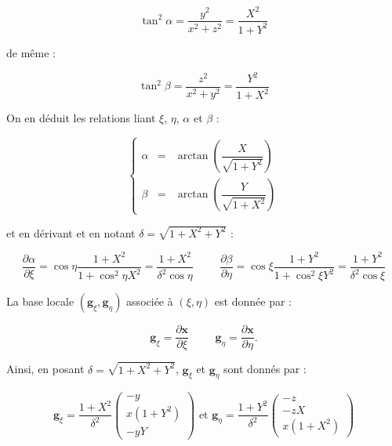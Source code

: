 \begin{equation}
\tan^2 \alpha = \dfrac{y^2}{x^2+z^2} = \dfrac{X^2}{1+Y^2}
\end{equation}

de même :

\begin{equation}
\tan^2 \beta = \dfrac{z^2}{x^2+y^2} = \dfrac{Y^2}{1+X^2}
\end{equation}

On en déduit les relations liant $\xi$, $\eta$, $\alpha$ et $\beta$ :

\begin{equation}
\left\lbrace
\begin{array}{rcl}
\alpha & = & \arctan \left( \dfrac{X}{\sqrt{1+Y^2}} \right)\\
\beta & = & \arctan \left( \dfrac{Y}{\sqrt{1+X^2}} \right)
\end{array}
\right.
\label{eq: alpha(xi) beta(eta)}
\end{equation}

et en dérivant et en notant $\delta=\sqrt{1+X^2+Y^2}$ :

\begin{equation}
\dfrac{\partial \alpha}{\partial \xi} = \cos \eta \dfrac{1+X^2}{1+\cos^2 \eta X^2} = \dfrac{1+X^2}{ \delta^2 \cos \eta}\hspace{1cm} \dfrac{\partial \beta}{\partial \eta} = \cos \xi \dfrac{1+Y^2}{1+\cos^2 \xi Y^2}= \dfrac{1+Y^2}{ \delta^2 \cos \xi }
\label{eq; der alpha beta}
\end{equation}

La base locale $(\mathbf{g}_{\xi}, \mathbf{g}_{\eta})$ associée à $(\xi,\eta)$ est donnée par :

$$\mathbf{g}_{\xi} = \dfrac{\partial \mathbf{x}}{\partial \xi} \hspace{1cm} \mathbf{g}_{\eta} = \dfrac{\partial \mathbf{x}}{\partial \eta}.$$

Ainsi, en posant $\delta = \sqrt{1+X^2+Y^2}$, $\mathbf{g}_{\xi}$ et $\mathbf{g}_{\eta}$ sont donnés par :

\begin{equation}
\mathbf{g}_{\xi} = \dfrac{1+X^2}{\delta^2} \begin{pmatrix}
-y \\ x(1+Y^2) \\ -yY
\end{pmatrix} \text{ et } \mathbf{g}_{\eta} = \dfrac{1+Y^2}{\delta^2} \begin{pmatrix}
-z \\ -zX \\ x(1+X^2)
\end{pmatrix}
\label{eq: base locale I}
\end{equation}


